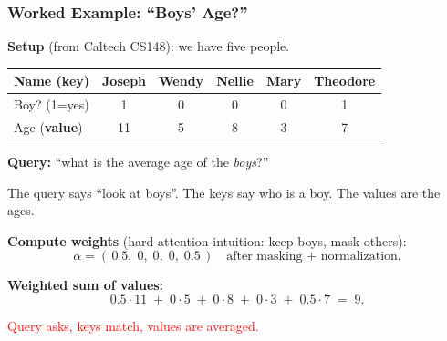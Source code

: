 \documentclass[notes,11pt, aspectratio=169]{beamer}
\begin{document}
\begin{frame}
\frametitle{Worked Example: ``Boys' Age?''}

\textbf{Setup} (from Caltech CS148): we have five people.

\vspace{2pt}
\begin{center}
\renewcommand{\arraystretch}{1.1}
\scriptsize
\begin{tabular}{l c c c c c}
\toprule
Name (\textbf{key}) & Joseph & Wendy & Nellie & Mary & Theodore \\
\midrule
Boy? (1=yes) & 1 & 0 & 0 & 0 & 1 \\
Age (\textbf{value}) & 11 & 5 & 8 & 3 & 7 \\
\bottomrule
\end{tabular}
\end{center}

\vspace{5pt}
\textbf{Query:} ``what is the average age of the \emph{boys}?''

\vspace{2pt}
The query says ``look at boys''. The keys say who is a boy. The values are the ages.

\vspace{5pt}
\textbf{Compute weights} (hard-attention intuition: keep boys, mask others):
\[
    \alpha = (\,0.5,\; 0,\; 0,\; 0,\; 0.5\,) \quad \text{after masking + normalization}.
\]

\textbf{Weighted sum of values:}
\[
    0.5 \cdot 11 \;+\; 0 \cdot 5 \;+\; 0 \cdot 8 \;+\; 0 \cdot 3 \;+\; 0.5 \cdot 7 \;=\; 9.
\]

\textcolor{red}{Query asks, keys match, values are averaged.}
\end{frame}
\end{document}
